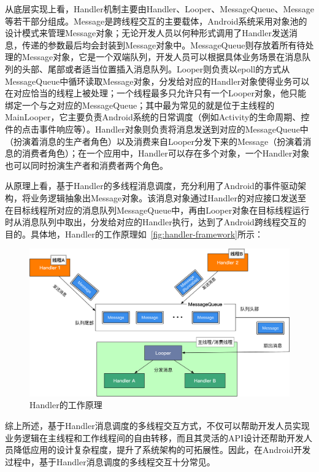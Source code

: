 从底层实现上看，Handler机制主要由Handler、Looper、MessageQueue、Message等若干部分组成。Message是跨线程交互的主要载体，Android系统采用对象池的设计模式来管理Message对象；无论开发人员以何种形式调用了Handler发送消息，传递的参数最后均会封装到Message对象中。MessageQueue则存放着所有待处理的Message对象，它是一个双端队列，开发人员可以根据具体业务场景在消息队列的头部、尾部或者适当位置插入消息队列。Looper则负责以epoll的方式从MessageQueue中循环读取Message对象，分发给对应的Handler对象使得业务可以在对应恰当的线程上被处理；一个线程最多只允许只有一个Looper对象，他只能绑定一个与之对应的MessageQueue；其中最为常见的就是位于主线程的MainLooper，它主要负责Android系统的日常调度（例如Activity的生命周期、控件的点击事件响应等）。Handler对象则负责将消息发送到对应的MessageQueue中（扮演着消息的生产者角色）以及消费来自Looper分发下来的Message（扮演着消息的消费者角色）；在一个应用中，Handler可以存在多个对象，一个Handler对象也可以同时扮演生产者和消费者两个角色。

从原理上看，基于Handler的多线程消息调度，充分利用了Android的事件驱动架构，将业务逻辑抽象出Message对象。该消息对象通过Handler的对应接口发送至在目标线程所对应的消息队列MessageQueue中，再由Looper对象在目标线程运行时从消息队列中取出，分发给对应的Handler执行，达到了Android跨线程交互的目的。具体地，Handler的工作原理如~\autoref{fig:handler-framework}所示：


\begin{figure}[h]
	\centering
	\includegraphics[width=\textwidth]{./Figures/Handler-framework.png}
	\caption{ Handler的工作原理}
	\label{fig:handler-framework}
\end{figure}


综上所述，基于Handler消息调度的多线程交互方式，不仅可以帮助开发人员实现业务逻辑在主线程和工作线程间的自由转移，而且其灵活的API设计还帮助开发人员降低应用的设计复杂程度，提升了系统架构的可拓展性。因此，在Android开发过程中，基于Handler消息调度的多线程交互十分常见。
